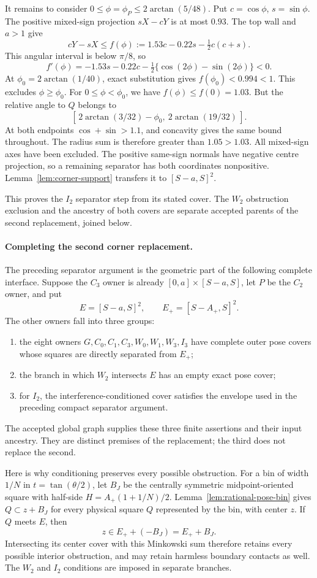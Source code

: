 \documentclass[11pt]{article}
\begin{document}
It remains to consider $0\le\phi=\phi_P\le2\arctan(5/48)$.
Put $c=\cos\phi$, $s=\sin\phi$. The positive mixed-sign projection
$sX-cY$ is at most $0.93$. The top wall and $a>1$ give
\[
 cY-sX\le f(\phi):=1.53c-0.22s-\tfrac12c(c+s).
\]
This angular interval is below $\pi/8$, so
\[
 f'(\phi)=-1.53s-0.22c-\tfrac12\{\cos(2\phi)-\sin(2\phi)\}<0.
\]
At $\phi_0=2\arctan(1/40)$, exact substitution gives $f(\phi_0)<0.994<1$.
This excludes $\phi\ge\phi_0$. For $0\le\phi<\phi_0$, we have
$f(\phi)\le f(0)=1.03$. But the relative angle to $Q$ belongs to
\[
 [\,2\arctan(3/32)-\phi_0,\ 2\arctan(19/32)\,].
\]
At both endpoints $\cos+\sin>1.1$, and concavity gives the same bound
throughout. The radius sum is therefore greater than $1.05>1.03$.
All mixed-sign axes have been excluded. The positive same-sign normals
have negative centre projection, so a remaining separator has both
coordinates nonpositive. Lemma~\ref{lem:corner-support} transfers it to
$[S-a,S]^2$.

This proves the $I_2$ separator step from its stated cover. The $W_2$
obstruction exclusion and the ancestry of both covers are separate
accepted parents of the second replacement, joined below.


\paragraph{Completing the second corner replacement.}
The preceding separator argument is the geometric part of the following
complete interface. Suppose the $C_3$ owner is already
$[0,a]\times[S-a,S]$, let $P$ be the $C_2$ owner, and put
\[
 E=[S-a,S]^2,\qquad E_+=[S-A_+,S]^2.
\]
The other owners fall into three groups:
\begin{enumerate}
\item the eight owners $G,C_0,C_1,C_3,W_0,W_1,W_3,I_3$ have complete
outer pose covers whose squares are directly separated from $E_+$;
\item the branch in which $W_2$ intersects $E$ has an empty exact pose cover;
\item for $I_2$, the interference-conditioned cover satisfies the envelope
used in the preceding compact separator argument.
\end{enumerate}
The accepted global graph supplies these three finite assertions and
their input ancestry. They are distinct premises of the replacement;
the third does not replace the second.

Here is why conditioning preserves every possible obstruction.
For a bin of width $1/N$ in $t=\tan(\theta/2)$, let $B_J$ be the centrally symmetric
midpoint-oriented square with half-side $H=A_+(1+1/N)/2$.
Lemma~\ref{lem:rational-pose-bin} gives $Q\subset z+B_J$ for every
physical square $Q$ represented by the bin, with center $z$.
If $Q$ meets $E$, then
\[
 z\in E_++(-B_J)=E_++B_J.
\]
Intersecting its center cover with this Minkowski sum therefore retains
every possible interior obstruction, and may retain harmless boundary
contacts as well. The $W_2$ and $I_2$ conditions are imposed in separate
branches.
\end{document}
